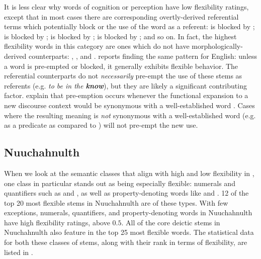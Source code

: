 It is less clear why words of cognition or perception have low flexibility ratings, except that in most cases there are corresponding overtly-derived referential terms which potentially block or  \parencite[798]{ClarkClark1979} the use of the word as a referent:  is blocked by ;  is blocked by ;  is blocked by ;  is blocked by ; and so on. In fact, the highest flexibility words in this category are ones which do not have morphologically-derived counterparts: , , and . \textcite[111]{Farrell2001} reports finding the same pattern for English: unless a word is pre-empted or blocked, it generally exhibits flexible behavior. The referential counterparts do not \emph{necessarily} pre-empt the use of these stems as referents (e.g. \textit{to be in the \textbf{know}}), but they are likely a significant contributing factor. \textcite[798]{ClarkClark1979} explain that pre-emption occurs whenever the functional expansion to a new discourse context would be synonymous with a well-established word . Cases where the resulting meaning is \emph{not} synonymous with a well-established word (e.g.  as a predicate as compared to ) will not pre-empt the new use.

\subsection{Nuuchahnulth}
\label{sec:4.6.2}

When we look at the semantic classes that align with high and low flexibility in , one class in particular stands out as being especially flexible: numerals and quantifiers such as  and , as well as property-denoting words like  and . 12 of the top 20 most flexible stems in Nuuchahnulth are of these types. With few exceptions, numerals, quantifiers, and property-denoting words in Nuuchahnulth have high flexibility ratings, above $0.5$. All of the core deictic stems in Nuuchahnulth also feature in the top 25 most flexible words. The statistical data for both these classes of stems, along with their rank in terms of flexibility, are listed in .

